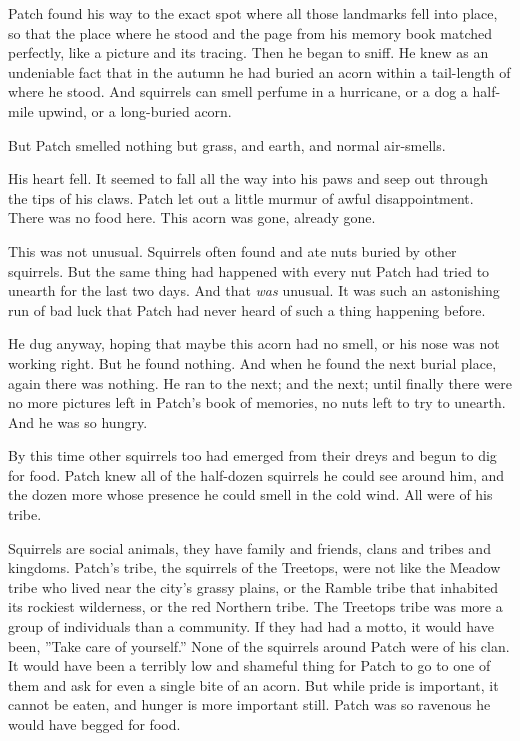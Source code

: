 \documentclass[12pt]{book}
\begin{document}
Patch found his way to the exact spot where all those landmarks fell into place, so that the place where he stood and the page from his memory book matched perfectly, like a picture and its tracing. Then he began to sniff. He knew as an undeniable fact that in the autumn he had buried an acorn within a tail-length of where he stood. And squirrels can smell perfume in a hurricane, or a dog a half-mile upwind, or a long-buried acorn.\par
But Patch smelled nothing but grass, and earth, and normal air-smells.\par
His heart fell. It seemed to fall all the way into his paws and seep out through the tips of his claws. Patch let out a little murmur of awful disappointment. There was no food here. This acorn was gone, already gone.\par
This was not unusual. Squirrels often found and ate nuts buried by other squirrels. But the same thing had happened with every nut Patch had tried to unearth for the last two days. And that {\it was} unusual. It was such an astonishing run of bad luck that Patch had never heard of such a thing happening before.\par
He dug anyway, hoping that maybe this acorn had no smell, or his nose was not working right. But he found nothing. And when he found the next burial place, again there was nothing. He ran to the next; and the next; until finally there were no more pictures left in Patch's book of memories, no nuts left to try to unearth. And he was so hungry.\par
By this time other squirrels too had emerged from their dreys and begun to dig for food. Patch knew all of the half-dozen squirrels he could see around him, and the dozen more whose presence he could smell in the cold wind. All were of his tribe.\par
Squirrels are social animals, they have family and friends, clans and tribes and kingdoms. Patch's tribe, the squirrels of the Treetops, were not like the Meadow tribe who lived near the city's grassy plains, or the Ramble tribe that inhabited its rockiest wilderness, or the red Northern tribe. The Treetops tribe was more a group of individuals than a community. If they had had a motto, it would have been, ''Take care of yourself.'' None of the squirrels around Patch were of his clan. It would have been a terribly low and shameful thing for Patch to go to one of them and ask for even a single bite of an acorn. But while pride is important, it cannot be eaten, and hunger is more important still. Patch was so ravenous he would have begged for food.\par
\end{document}
